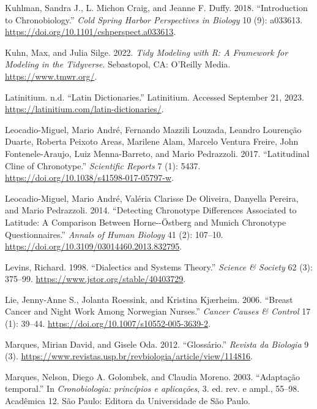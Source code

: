 \documentclass[
  12pt,
  a4paper,
  oneside]{tesesusp}
\newlength{\cslhangindent}
\newlength{\cslentryspacingunit} %
\newenvironment{CSLReferences}[2] %
 {%
  \setlength{\parindent}{0pt}
  \ifodd #1
  \let\oldpar\par
  \def\par{\hangindent=\cslhangindent\oldpar}
  \fi
  \setlength{\parskip}{#2\cslentryspacingunit}
 }%
 {}
\begin{document}
\begin{CSLReferences}{1}{0}
\leavevmode{}%
Kuhlman, Sandra J., L. Michon Craig, and Jeanne F. Duffy. 2018.
{``Introduction to Chronobiology.''} \emph{Cold Spring Harbor
Perspectives in Biology} 10 (9): a033613.
\url{https://doi.org/10.1101/cshperspect.a033613}.

\leavevmode{}%
Kuhn, Max, and Julia Silge. 2022. \emph{Tidy Modeling with R: A
Framework for Modeling in the Tidyverse}. Sebastopol, CA: O'Reilly
Media. \url{https://www.tmwr.org/}.

\leavevmode{}%
Latinitium. n.d. {``Latin Dictionaries.''} Latinitium. Accessed
September 21, 2023. \url{https://latinitium.com/latin-dictionaries/}.

\leavevmode{}%
Leocadio-Miguel, Mario André, Fernando Mazzili Louzada, Leandro
Lourenção Duarte, Roberta Peixoto Areas, Marilene Alam, Marcelo Ventura
Freire, John Fontenele-Araujo, Luiz Menna-Barreto, and Mario Pedrazzoli.
2017. {``Latitudinal Cline of Chronotype.''} \emph{Scientific Reports} 7
(1): 5437. \url{https://doi.org/10.1038/s41598-017-05797-w}.

\leavevmode{}%
Leocadio-Miguel, Mario André, Valéria Clarisse De Oliveira, Danyella
Pereira, and Mario Pedrazzoli. 2014. {``Detecting Chronotype Differences
Associated to Latitude: A Comparison Between Horne-\/-Östberg and Munich
Chronotype Questionnaires.''} \emph{Annals of Human Biology} 41 (2):
107--10. \url{https://doi.org/10.3109/03014460.2013.832795}.

\leavevmode{}%
Levins, Richard. 1998. {``Dialectics and Systems Theory.''}
\emph{Science \& Society} 62 (3): 375--99.
\url{https://www.jstor.org/stable/40403729}.

\leavevmode{}%
Lie, Jenny-Anne S., Jolanta Roessink, and Kristina Kjærheim. 2006.
{``Breast Cancer and Night Work Among Norwegian Nurses.''} \emph{Cancer
Causes \& Control} 17 (1): 39--44.
\url{https://doi.org/10.1007/s10552-005-3639-2}.

\leavevmode{}%
Marques, Mirian David, and Gisele Oda. 2012. {``Glossário.''}
\emph{Revista da Biologia} 9 (3).
\url{https://www.revistas.usp.br/revbiologia/article/view/114816}.

\leavevmode{}%
Marques, Nelson, Diego A. Golombek, and Claudia Moreno. 2003.
{``Adaptação temporal.''} In \emph{Cronobiologia: princípios e
aplicações}, 3. ed. rev. e ampl., 55--98. Acadêmica 12. São Paulo:
Editora da Universidade de São Paulo.


\end{CSLReferences}
\end{document}
